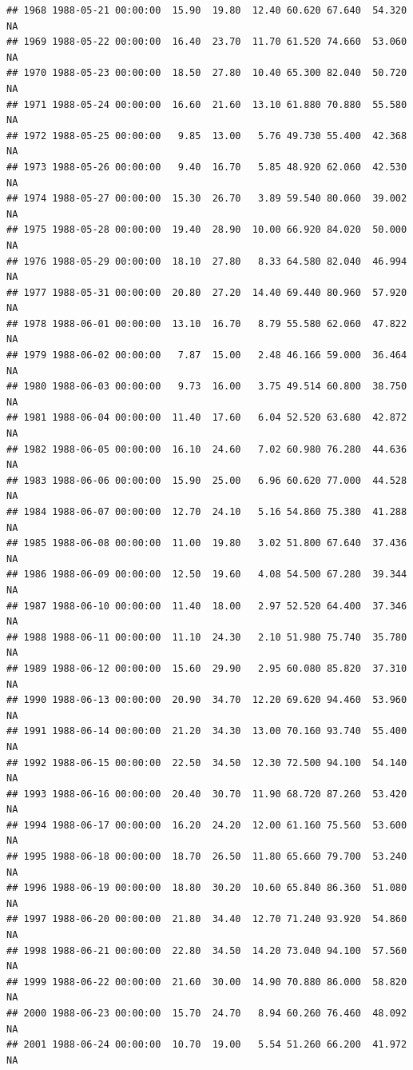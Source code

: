 \documentclass{article}\usepackage{graphicx, color}
\makeatletter
\newenvironment{kframe}{%
 \def\at@end@of@kframe{}%
 \ifinner\ifhmode%
  \def\at@end@of@kframe{\end{minipage}}%
  \begin{minipage}{\columnwidth}%
 \fi\fi%
 \def\FrameCommand##1{\hskip\@totalleftmargin \hskip-\fboxsep
 \colorbox{shadecolor}{##1}\hskip-\fboxsep
     \hskip-\linewidth \hskip-\@totalleftmargin \hskip\columnwidth}%
 \MakeFramed {\advance\hsize-\width
   \@totalleftmargin\z@ \linewidth\hsize
   \@setminipage}}%
 {\par\unskip\endMakeFramed%
 \at@end@of@kframe}
\newenvironment{knitrout}{}{} %
\makeatother
\begin{document}
\begin{knitrout}
\begin{kframe}
\begin{verbatim}
## 1968 1988-05-21 00:00:00  15.90  19.80  12.40 60.620 67.640  54.320     NA
## 1969 1988-05-22 00:00:00  16.40  23.70  11.70 61.520 74.660  53.060     NA
## 1970 1988-05-23 00:00:00  18.50  27.80  10.40 65.300 82.040  50.720     NA
## 1971 1988-05-24 00:00:00  16.60  21.60  13.10 61.880 70.880  55.580     NA
## 1972 1988-05-25 00:00:00   9.85  13.00   5.76 49.730 55.400  42.368     NA
## 1973 1988-05-26 00:00:00   9.40  16.70   5.85 48.920 62.060  42.530     NA
## 1974 1988-05-27 00:00:00  15.30  26.70   3.89 59.540 80.060  39.002     NA
## 1975 1988-05-28 00:00:00  19.40  28.90  10.00 66.920 84.020  50.000     NA
## 1976 1988-05-29 00:00:00  18.10  27.80   8.33 64.580 82.040  46.994     NA
## 1977 1988-05-31 00:00:00  20.80  27.20  14.40 69.440 80.960  57.920     NA
## 1978 1988-06-01 00:00:00  13.10  16.70   8.79 55.580 62.060  47.822     NA
## 1979 1988-06-02 00:00:00   7.87  15.00   2.48 46.166 59.000  36.464     NA
## 1980 1988-06-03 00:00:00   9.73  16.00   3.75 49.514 60.800  38.750     NA
## 1981 1988-06-04 00:00:00  11.40  17.60   6.04 52.520 63.680  42.872     NA
## 1982 1988-06-05 00:00:00  16.10  24.60   7.02 60.980 76.280  44.636     NA
## 1983 1988-06-06 00:00:00  15.90  25.00   6.96 60.620 77.000  44.528     NA
## 1984 1988-06-07 00:00:00  12.70  24.10   5.16 54.860 75.380  41.288     NA
## 1985 1988-06-08 00:00:00  11.00  19.80   3.02 51.800 67.640  37.436     NA
## 1986 1988-06-09 00:00:00  12.50  19.60   4.08 54.500 67.280  39.344     NA
## 1987 1988-06-10 00:00:00  11.40  18.00   2.97 52.520 64.400  37.346     NA
## 1988 1988-06-11 00:00:00  11.10  24.30   2.10 51.980 75.740  35.780     NA
## 1989 1988-06-12 00:00:00  15.60  29.90   2.95 60.080 85.820  37.310     NA
## 1990 1988-06-13 00:00:00  20.90  34.70  12.20 69.620 94.460  53.960     NA
## 1991 1988-06-14 00:00:00  21.20  34.30  13.00 70.160 93.740  55.400     NA
## 1992 1988-06-15 00:00:00  22.50  34.50  12.30 72.500 94.100  54.140     NA
## 1993 1988-06-16 00:00:00  20.40  30.70  11.90 68.720 87.260  53.420     NA
## 1994 1988-06-17 00:00:00  16.20  24.20  12.00 61.160 75.560  53.600     NA
## 1995 1988-06-18 00:00:00  18.70  26.50  11.80 65.660 79.700  53.240     NA
## 1996 1988-06-19 00:00:00  18.80  30.20  10.60 65.840 86.360  51.080     NA
## 1997 1988-06-20 00:00:00  21.80  34.40  12.70 71.240 93.920  54.860     NA
## 1998 1988-06-21 00:00:00  22.80  34.50  14.20 73.040 94.100  57.560     NA
## 1999 1988-06-22 00:00:00  21.60  30.00  14.90 70.880 86.000  58.820     NA
## 2000 1988-06-23 00:00:00  15.70  24.70   8.94 60.260 76.460  48.092     NA
## 2001 1988-06-24 00:00:00  10.70  19.00   5.54 51.260 66.200  41.972     NA

\end{verbatim}
\end{kframe}
\end{knitrout}
\end{document}
